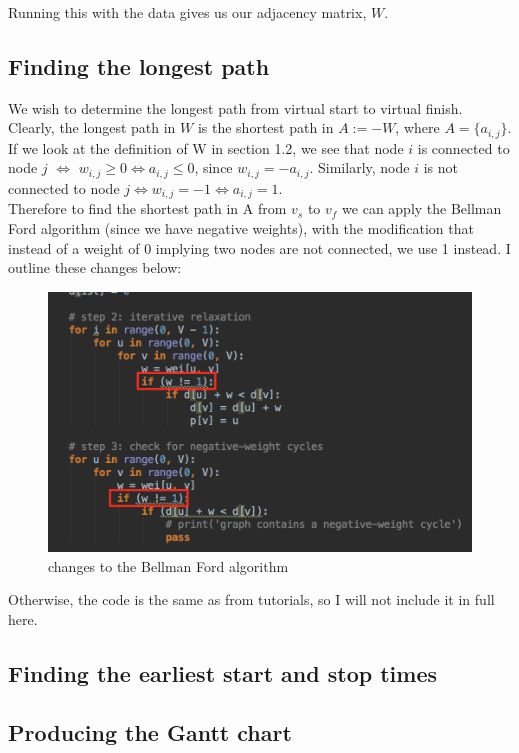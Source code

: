 \documentclass[paper=a4, fontsize=12pt]{scrartcl} %
\numberwithin{equation}{section}       %
\numberwithin{figure}{section}         %
\numberwithin{table}{section}          %
\begin{document}
Running this with the data gives us our adjacency matrix, $W$.

\subsection{Finding the longest path}

We wish to determine the longest path from virtual start to virtual finish. Clearly, the longest path in $W$ is the shortest path in $A:=-W$, where $A = \{a_{i,j} \}$. If we look at the definition of W in section 1.2, we see that node $i$ is connected to node $j$ $\iff$ $w_{i,j} \geq 0 \iff a_{i,j} \leq 0$, since $w_{i,j} = -a_{i,j}$. Similarly, node $i$ is not connected to node $j \iff w_{i,j} = -1 \iff a_{i,j} = 1$. \\
Therefore to find the shortest path in A from $v_{s}$ to $v_{f}$ we can apply the Bellman Ford algorithm (since we have negative weights), with the modification that instead of a weight of 0 implying two nodes are not connected, we use 1 instead. I outline these changes below:

\begin{figure}[h]
\caption{changes to the Bellman Ford algorithm}
\centering
\includegraphics{changes}
\end{figure}

Otherwise, the code is the same as from tutorials, so I will not include it in full here.

\subsection{Finding the earliest start and stop times}
\subsection{Producing the Gantt chart}
\end{document}
